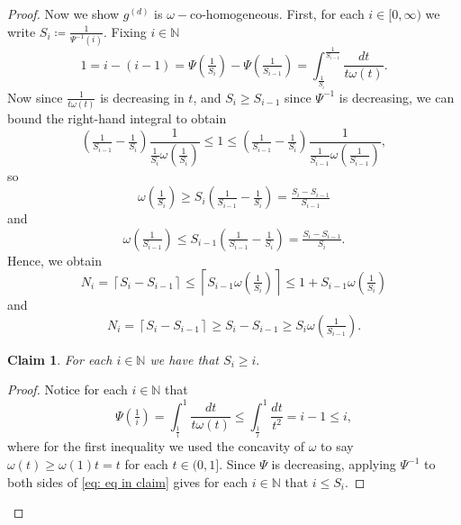 \documentclass{article}
\newtheorem{claim}[define]{Claim}
\newcommand{\N}{\mathbb{N}}
\begin{document}
\begin{proof}
    Now we show $g^{(d)}$ is $\omega-$co-homogeneous. First, for each $i \in [0,\infty)$ we write $S_i \coloneqq \frac{1}{\Psi^{-1}(i)}.$ Fixing $i \in \N$
    \begin{equation*}
        1 = i-(i-1) = \Psi\left(\tfrac{1}{S_{i}}\right) - \Psi\left(\tfrac{1}{S_{i-1}}\right) = \int_{\frac{1}{S_i}}^{\frac{1}{S_{i-1}}}\frac{dt}{t\omega(t)}.
    \end{equation*}
    Now since $\frac{1}{t\omega(t)}$ is decreasing in $t$, and $S_i \geq S_{i-1}$ since $\Psi^{-1}$ is decreasing, we can bound the right-hand integral to obtain
    \begin{equation*}
        \left(\tfrac{1}{S_{i-1}}-\tfrac{1}{S_i}\right) \frac{1}{\frac{1}{S_i}\omega(\frac{1}{S_i})} \leq   1 \leq  \left(\tfrac{1}{S_{i-1}}-\tfrac{1}{S_i}\right) \frac{1}{\frac{1}{S_{i-1}}\omega(\frac{1}{S_{i-1}})},
    \end{equation*} so 
$$\omega\left(\tfrac{1}{S_i}\right) \geq S_i\left(\tfrac{1}{S_{i-1}}-\tfrac{1}{S_i}\right)  = \tfrac{S_i-S_{i-1}}{S_{i-1}}$$ and
$$\omega\left(\tfrac{1}{S_{i-1}}\right) \leq S_{i-1}\left(\tfrac{1}{S_{i-1}}-\tfrac{1}{S_i}\right) = \tfrac{S_i-S_{i-1}}{S_i}.$$
    Hence, we obtain 
\begin{equation}\label{eq: Si}
        N_i = \left\lceil S_i-S_{i-1}\right\rceil \leq \left\lceil S_{i-1}\omega\left(\tfrac{1}{S_i}\right)\right\rceil \leq 1+ S_{i-1}\omega\left(\tfrac{1}{S_i}\right)
    \end{equation} and
    \begin{equation}\label{eq: Si 2}
        N_i = \left\lceil S_i-S_{i-1}\right\rceil \geq  S_i-S_{i-1} \geq S_{i}\omega\left(\tfrac{1}{S_{i-1}}\right).
    \end{equation}
    \begin{claim}\label{claim: I}
       For each $i \in \N$ we have that
        $S_i \geq i.$
    \end{claim}
    \begin{proof}
Notice for each $i \in \N$ that
\begin{equation} \label{eq: eq in claim}
    \Psi\left(\tfrac{1}{i}\right) = \int_{\frac{1}{i}}^1 \frac{dt}{t\omega(t)} \leq \int_{\frac{1}{i}}^1 \frac{dt}{t^2} = i-1\leq i,
\end{equation}
 where for the first inequality we used the concavity of $\omega$ to say $\omega(t) \geq \omega(1)t = t$ for each $t \in (0,1].$ Since $\Psi$ is decreasing, applying $\Psi^{-1}$ to both sides of \eqref{eq: eq in claim} gives for each $i \in \N$ that $i\leq S_i.$
    \end{proof}

\end{proof}
\end{document}
